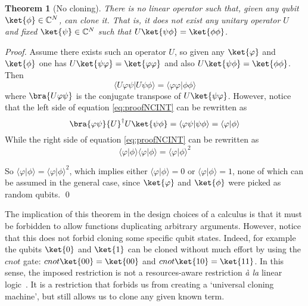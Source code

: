 \documentclass[preprint]{elsarticle}
\newtheorem{theorem}{Theorem}[section]
\newcommand\braket[2]{\langle{#1}|{#2}\rangle}
\begin{document}
\begin{theorem}[No cloning]\label{thm:nocloningINT}
  There is no linear operator such that, given any qubit
  $\ket{\phi}\in\mathbb{C}^N$, can clone it. That is, it does not exist any
  unitary operator $U$ and fixed $\ket{\psi}\in\mathbb{C}^N$ such that
  $U\ket{\psi\phi}=\ket{\phi\phi}$.
\end{theorem}
\begin{proof}
  Assume there exists such an operator $U$, so given any $\ket{\varphi}$ and
  $\ket{\phi}$ one has $U\ket{\psi\varphi}=\ket{\varphi\varphi}$ and also
  $U\ket{\psi\phi}=\ket{\phi\phi}$. Then
  \begin{equation}\label{eq:proofNCINT}
    \braket{U\varphi\psi}{U\psi\phi}=\braket{\varphi\varphi}{\phi\phi}
  \end{equation}
  where $\bra{U\varphi\psi}$ is the conjugate transpose of $U\ket{\psi\varphi}$.
  However, notice that the left side of equation \eqref{eq:proofNCINT} can be
  rewritten as
  \[
    \bra{\varphi\psi}{U}^\dagger
    U\ket{\psi\phi}=\braket{\varphi\psi}{\psi\phi}=\braket{\varphi}{\phi}
  \]
  While the right side of equation \eqref{eq:proofNCINT} can be rewritten as
  \[
    \braket{\varphi}{\phi}\braket{\varphi}{\phi}={\braket{\varphi}{\phi}}^2
  \]

  So $\braket{\varphi}{\phi}={\braket{\varphi}{\phi}}^2$, which implies either
  $\braket{\varphi}{\phi}=0$ or $\braket{\varphi}{\phi}=1$, none of which can be
  assumed in the general case, since $\ket{\varphi}$ and $\ket{\phi}$ were
  picked as random qubits. \qed
\end{proof}

The implication of this theorem in the design choices of a calculus is that it
must be forbidden to allow functions duplicating arbitrary arguments. However,
notice that this does not forbid cloning some specific qubit states. Indeed, for
example the qubits $\ket{0}$ and $\ket{1}$ can be cloned without much effort by
using the $cnot$ gate: $cnot\ket{00}=\ket{00}$ and $cnot\ket{10}=\ket{11}$. In
this sense, the imposed restriction is not a resources-aware restriction {\em
  \`a la} linear logic~\cite{GirardTCS87}. It is a restriction that forbids us
from creating a `universal cloning machine', but still allows us to clone any
given known term.
\end{document}
